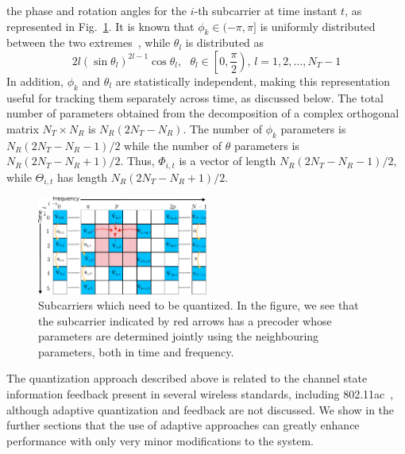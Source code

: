\documentclass[journal,10pt,twocolumn]{IEEEtran}
\begin{document}
the phase and rotation angles for the $i$-th subcarrier at time
instant $t$, as represented in Fig.~\ref{fig:adpm-fig}. It is known
that $\phi_k \in (-\pi, \pi]$ is uniformly distributed between the two
extremes~\cite{4114278}, while $\theta_l$ is distributed
as~\cite{4114278}
\begin{equation}
2l(\sin\theta_l)^{2l-1}\cos\theta_l, \mbox{  }\theta_l \in \left[0, \frac{\pi}{2}\right) \mbox{, } l = 1,2,\ldots,N_T -1
\end{equation}
In addition, $\phi_k$ and $\theta_l$ are statistically independent,
making this representation useful for tracking them separately across
time, as discussed below. The total number of
parameters obtained from the decomposition of a complex orthogonal
matrix $N_{T} \times N_{R} $ is $N_{R}(2N_{T} - N_{R})$. The number of
$\phi_k$ parameters is $N_{R}(2N_{T} - N_{R}-1)/2$ while the number of
$\theta$ parameters is $N_{R}(2N_{T} - N_{R}+1)/2$. Thus, $\Phi_{i,t}$
is a vector of length $N_{R}(2N_{T} - N_{R}-1)/2$, while
$\Theta_{i,t}$ has length $N_{R}(2N_{T} - N_{R}+1)/2$.
\begin{figure}
\includegraphics[width=0.5\textwidth]{images/new-adpm.pdf}
\caption{\label{fig:adpm-fig}Subcarriers which need to be
  quantized. In the figure, we see that the subcarrier indicated by
  red arrows has a precoder whose parameters are determined jointly
  using the neighbouring parameters, both in time and frequency.}
\end{figure}

The quantization approach described above is related to the channel
state information feedback present in several wireless standards,
including 802.11ac~\cite{lou2013comparison}, although adaptive
quantization and feedback are not discussed. We show in the further
sections that the use of adaptive approaches can greatly enhance
performance with only very minor modifications to the system.
\end{document}
